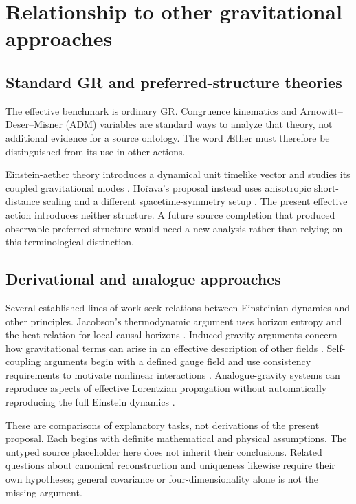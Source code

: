 \documentclass[11pt,oneside]{report}
\newcommand{\Aether}{\AE{}ther}
\theoremstyle{remark}
\numberwithin{definition}{chapter}
\numberwithin{proposition}{chapter}
\numberwithin{remark}{chapter}
\begin{document}
\section{Relationship to other gravitational approaches}
\subsection{Standard GR and preferred-structure theories}
The effective benchmark is ordinary GR. Congruence kinematics and Arnowitt--Deser--Misner (ADM) variables are standard ways to analyze that theory, not additional evidence for a source ontology. The word \Aether{} must therefore be distinguished from its use in other actions.

Einstein-aether theory introduces a dynamical unit timelike vector and studies its coupled gravitational modes \parencite{JacobsonMattingly2001,JacobsonMattingly2004}. Ho\v{r}ava's proposal instead uses anisotropic short-distance scaling and a different spacetime-symmetry setup \parencite{Horava2009}. The present effective action introduces neither structure. A future source completion that produced observable preferred structure would need a new analysis rather than relying on this terminological distinction.

\subsection{Derivational and analogue approaches}
Several established lines of work seek relations between Einsteinian dynamics and other principles. Jacobson's thermodynamic argument uses horizon entropy and the heat relation for local causal horizons \parencite{Jacobson1995}. Induced-gravity arguments concern how gravitational terms can arise in an effective description of other fields \parencite{Visser2002}. Self-coupling arguments begin with a defined gauge field and use consistency requirements to motivate nonlinear interactions \parencite{Deser2004}. Analogue-gravity systems can reproduce aspects of effective Lorentzian propagation without automatically reproducing the full Einstein dynamics \parencite{BarceloLiberatiVisser2011}.

These are comparisons of explanatory tasks, not derivations of the present proposal. Each begins with definite mathematical and physical assumptions. The untyped source placeholder here does not inherit their conclusions. Related questions about canonical reconstruction and uniqueness likewise require their own hypotheses; general covariance or four-dimensionality alone is not the missing argument.
\end{document}
